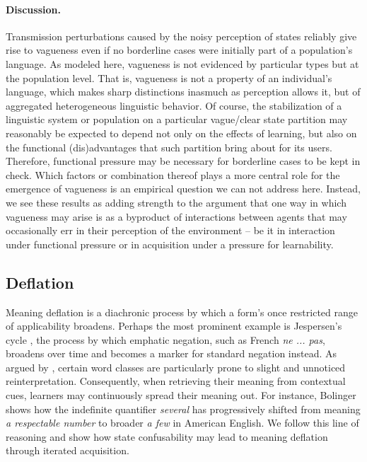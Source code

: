 \documentclass[10pt,a4paper]{article}
\begin{document}
\paragraph{Discussion.}
Transmission perturbations caused by the noisy perception of states reliably give rise to vagueness even if no borderline cases were initially part of a population's language. As modeled here, vagueness is not evidenced by particular types but at the population level. That is, vagueness is not a property of an individual's language, which makes sharp distinctions inasmuch as perception allows it, but of aggregated heterogeneous linguistic behavior. Of course, the stabilization of a linguistic system or population on a particular vague/clear state partition may reasonably be expected to depend not only on the effects of learning, but also on the functional (dis)advantages that such partition bring about for its users. Therefore, functional pressure may be necessary for borderline cases to be kept in check. Which factors or combination thereof plays a more central role for the emergence of vagueness is an empirical question we can not address here. Instead, we see these results as adding strength to the argument that one way in which vagueness may arise is as a byproduct of interactions between agents that may occasionally err in their perception of the environment -- be it in interaction under functional pressure or in acquisition under a pressure for learnability. 

\subsection{Deflation}
Meaning deflation is a diachronic process by which a form's once restricted range of applicability broadens. Perhaps the most prominent example is Jespersen's cycle \citep{dahl:1979}, the process by which emphatic negation, such as French {\em ne ... pas}, broadens over time and becomes a marker for standard negation instead. As argued by \citet{bolinger:1981}, certain word classes are particularly prone to slight and unnoticed reinterpretation. Consequently, when retrieving their meaning from contextual cues, learners may continuously spread their meaning out. For instance, Bolinger shows how the indefinite quantifier {\em several} has progressively shifted from meaning {\em a respectable number} to broader {\em a few} in American English. We follow this line of reasoning and show how state confusability may lead to meaning deflation through iterated acquisition.
\end{document}
